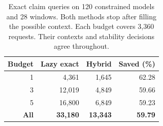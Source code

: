 \begin{table}[t]
\centering\small
\begin{tabular}{@{}rrrr@{}}
\toprule
Budget & Lazy exact & Hybrid & Saved (\%)\\
\midrule
1 & 4,361 & 1,645 & 62.28\\
3 & 12,019 & 4,849 & 59.66\\
5 & 16,800 & 6,849 & 59.23\\
\midrule
\textbf{All} & \textbf{33,180} & \textbf{13,343} & \textbf{59.79}\\
\bottomrule
\end{tabular}
\caption{Exact claim queries on 120 constrained models and 28 windows. Both methods stop after filling the possible context. Each budget covers 3,360 requests. Their contexts and stability decisions agree throughout.}
\label{tab:hybrid}
\end{table}
